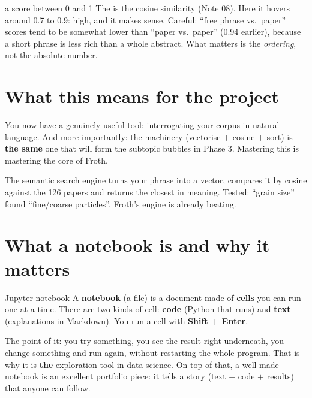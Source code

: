 \documentclass[11pt,a4paper]{article}
\begin{document}
\begin{concepto}{a score between 0 and 1}
The  is the cosine similarity (Note 08). Here it hovers around 0.7 to 0.9:
high, and it makes sense. Careful: ``free phrase vs.\ paper'' scores tend to be somewhat
lower than ``paper vs.\ paper'' (0.94 earlier), because a short phrase is less rich than a
whole abstract. What matters is the \emph{ordering}, not the absolute number.
\end{concepto}

\section{What this means for the project}

You now have a genuinely useful tool: interrogating your corpus in natural language. And more
importantly: the machinery (vectorise $+$ cosine $+$ sort) is \textbf{the same} one that will
form the subtopic bubbles in Phase 3. Mastering this is mastering the core of Froth.

\begin{resumen}
The semantic search engine turns your phrase into a vector, compares it by cosine against the
126 papers and returns the closest in meaning. Tested: ``grain size'' found ``fine/coarse
particles''. Froth's engine is already beating.
\end{resumen}
\clearpage
{}
{}

\section{What a notebook is and why it matters}

\begin{concepto}{Jupyter notebook}
A \textbf{notebook} (a  file) is a document made of \textbf{cells} you can run
one at a time. There are two kinds of cell: \textbf{code} (Python that runs) and \textbf{text}
(explanations in Markdown). You run a cell with \textbf{Shift + Enter}.
\end{concepto}

The point of it: you try something, you see the result right underneath, you change something
and run again, without restarting the whole program. That is why it is \textbf{the}
exploration tool in data science. On top of that, a well-made notebook is an excellent
portfolio piece: it tells a story (text $+$ code $+$ results) that anyone can follow.
\end{document}
